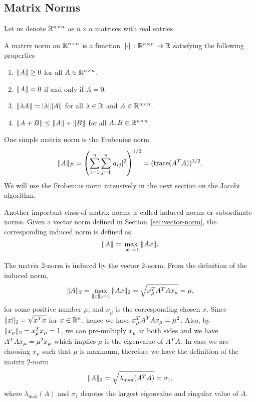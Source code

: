 \subsection{Matrix Norms}

Let us denote $\mathbb{R}^{n\times n}$ as $n\times n$ matrices with real entries.

\begin{definition}
  A matrix norm on $\mathbb{R}^{n\times n}$ is a function $\|{\cdot}\|:\mathbb{R}^{n\times n} \to \mathbb{R}$ satisfying the following properties 
  \begin{enumerate}
    \item $\|{A}\| \geq 0$ for all $A\in\mathbb{R}^{n\times n}$.
    \item $\|{A}\| = 0$ if and only if $A = 0$.
    \item $\|{\lambda A}\| = \lvert\lambda\rvert\|{A}\|$ for all $\lambda \in \mathbb{R}$ and $A\in\mathbb{R}^{n\times n}$.
    \item $\|{A + B}\| \leq \|{A}\| + \|{B}\|$ for all $A,B \in \mathbb{R}^{n\times n}$. 
  \end{enumerate}
\end{definition}

One simple matrix norm is the Frobenius norm 
\begin{equation}
  \|{A}\|_F = \left(\sum_{i = 1}^n \sum_{j = 1}^n \lvert a_{ij}\rvert^2 \right)^{1/2} = (\mathrm{trace}(A^T A))^{1/2}.
\end{equation}
We will use the Frobenius norm intensively in the next section on the Jacobi algorithm.

Another important class of matrix norms is called induced norms or subordinate norms. Given a vector norm defined in Section~\ref{sec:vector-norm}, the corresponding induced norm is defined as 
\begin{equation}\notag
  \|{A}\| = \max_{\|{x}\| = 1}\|{Ax}\|.
\end{equation}

\begin{example}
  The matrix 2-norm is induced by the vector 2-norm. From the definition of the induced norm, 
  \begin{equation}\notag
      \|{A}\|_2 = \max_{\|{x}\|_2 = 1} \|{Ax}\|_2 = \sqrt{x_\mu^T A^T A x_\mu} = \mu,
  \end{equation}
  for some positive number $\mu$, and $x_\mu$ is the corresponding chosen $x$. Since $\|{x}\|_2 = \sqrt{x^T x}$ for $x\in\mathbb{R}^n$, hence we have $x_\mu^T A^T A x_\mu = \mu^2$. Also, by $\|{x_\mu}\|_2 = x_\mu^T x_\mu = 1$, we can pre-multiply $x_\mu$ at both sides and we have  $A^T A x_\mu = \mu^2 x_\mu$ which implies $\mu$ is the eigenvalue of $A^T A$. In case we are choosing $x_\mu$ such that $\mu$ is maximum, therefore we have the definition of the matrix 2-norm 
  \begin{equation}\label{eq:example-2.4}
    \|{A}\|_2 = \sqrt{\lambda_{\max}(A^T A)} = \sigma_1,
  \end{equation} 
  where $\lambda_{\max}(A)$ and $\sigma_1$ denotes the largest eigenvalue and singular value of $A$. 
\end{example}

